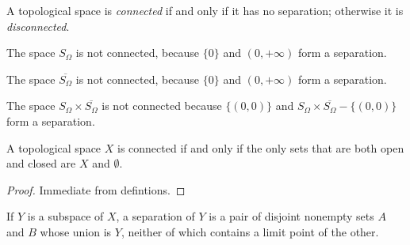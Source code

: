 \begin{definition}[Connected]
    A topological space is \emph{connected} if and only if it has no separation; otherwise it is \emph{disconnected}.
\end{definition}

\begin{example}
    The space $S_\Omega$ is not connected, because $\{0\}$ and $(0, +\infty)$ form a separation.
\end{example}

\begin{example}
    The space $\overline{S_\Omega}$ is not connected, because $\{0\}$ and $(0, +\infty)$ form a separation.
\end{example}

\begin{example}
    The space $S_\Omega \times \overline{S_\Omega}$ is not connected because $\{(0,0)\}$
    and $S_\Omega \times \overline{S_\Omega} - \{(0,0)\}$ form a separation.
\end{example}

\begin{proposition}
    \label{proposition:open_closed_connective}
    A topological space $X$ is connected if and only if the only sets that are both open and closed are $X$ and $\emptyset$.
\end{proposition}

\begin{proof}
    Immediate from defintions.
\end{proof}

\begin{lemma}
    \label{lemma:limit_point_separation}
    If $Y$ is a subspace of $X$, a separation of $Y$ is a pair of disjoint nonempty sets $A$ and $B$ whose union is $Y$, neither of which contains a limit point of the other.
\end{lemma}

